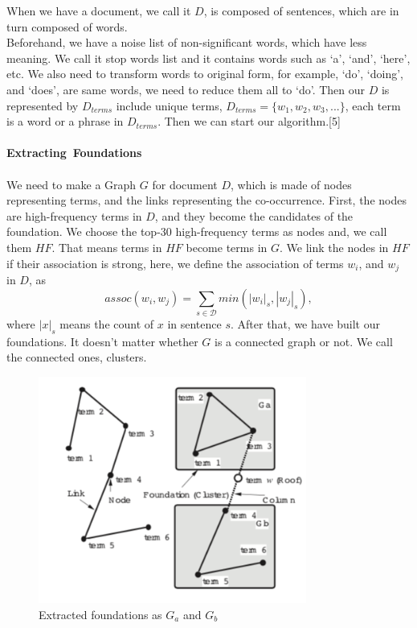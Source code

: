 When we have a document, we call it $D$, is composed of sentences, which are in turn composed of words.\\
Beforehand, we have a noise list of non-significant words, which have less meaning. We call it stop words list and it contains words such as `a', `and', `here', etc. We also need to transform words to original form, for example, `do', `doing', and `does', are same words, we need to reduce them all to `do'. Then our $D$ is represented by $D_{terms}$ include unique terms, $D_{terms} = \{w_1, w_2, w_3,...\}$, each term is a word or a phrase in $D_{terms}$. Then we can start our algorithm.[5]\\ \\
\textbf{Extracting\ Foundations}\\ \\
We need to make a Graph $G$ for document $D$, which is made of nodes representing terms, and the links representing the co-occurrence. First, the nodes are high-frequency terms in $D$, and they become the candidates of the foundation. We choose the top-30 high-frequency terms as nodes and, we call them $HF$. That means terms in $HF$ become terms in $G$. We link the nodes in $HF$ if their association is strong, here, we define the association of terms $w_i$, and $w_j$ in $D$, as
\begin{displaymath}
assoc(w_i,w_j) = \sum_{s \in \mathcal{D}} min(|w_i|_s, |w_j|_s),
\end{displaymath}
where $|x|_s$ means the count of $x$ in sentence $s$. After that, we have built our foundations. It doesn't matter whether $G$ is a connected graph or not. We call the connected ones, clusters.
\begin{figure}[!hbp]
\centering
\includegraphics[width=250pt]{./pictures/0203.png}
\caption{Extracted foundations as $G_a$ and $G_b$}
\end{figure}
